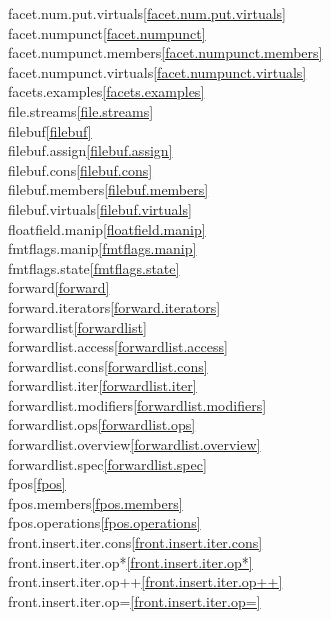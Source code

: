 \begin{multicols}{2}
facet.num.put.virtuals\quad\ref{facet.num.put.virtuals}\\
facet.numpunct\quad\ref{facet.numpunct}\\
facet.numpunct.members\quad\ref{facet.numpunct.members}\\
facet.numpunct.virtuals\quad\ref{facet.numpunct.virtuals}\\
facets.examples\quad\ref{facets.examples}\\
file.streams\quad\ref{file.streams}\\
filebuf\quad\ref{filebuf}\\
filebuf.assign\quad\ref{filebuf.assign}\\
filebuf.cons\quad\ref{filebuf.cons}\\
filebuf.members\quad\ref{filebuf.members}\\
filebuf.virtuals\quad\ref{filebuf.virtuals}\\
floatfield.manip\quad\ref{floatfield.manip}\\
fmtflags.manip\quad\ref{fmtflags.manip}\\
fmtflags.state\quad\ref{fmtflags.state}\\
forward\quad\ref{forward}\\
forward.iterators\quad\ref{forward.iterators}\\
forwardlist\quad\ref{forwardlist}\\
forwardlist.access\quad\ref{forwardlist.access}\\
forwardlist.cons\quad\ref{forwardlist.cons}\\
forwardlist.iter\quad\ref{forwardlist.iter}\\
forwardlist.modifiers\quad\ref{forwardlist.modifiers}\\
forwardlist.ops\quad\ref{forwardlist.ops}\\
forwardlist.overview\quad\ref{forwardlist.overview}\\
forwardlist.spec\quad\ref{forwardlist.spec}\\
fpos\quad\ref{fpos}\\
fpos.members\quad\ref{fpos.members}\\
fpos.operations\quad\ref{fpos.operations}\\
front.insert.iter.cons\quad\ref{front.insert.iter.cons}\\
front.insert.iter.op*\quad\ref{front.insert.iter.op*}\\
front.insert.iter.op++\quad\ref{front.insert.iter.op++}\\
front.insert.iter.op=\quad\ref{front.insert.iter.op=}\\

\end{multicols}
